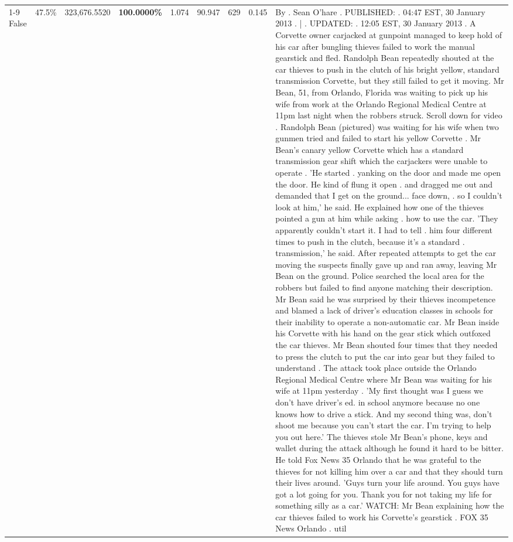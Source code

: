 \begin{table}[H]
\begin{tabular}{lllrlllll}
\cline{1-9} \cline{2-9}
False & 47.5\% & 323,676.5520 & \bfseries \color{red} 100.0000\% & 1.074 & 90.947 & 629 & 0.145 & By . Sean O'hare . PUBLISHED: . 04:47 EST, 30 January 2013 . | . UPDATED: . 12:05 EST, 30 January 2013 . A Corvette owner carjacked at gunpoint managed to keep hold of his car after bungling thieves failed to work the manual gearstick and fled. Randolph Bean repeatedly shouted at the car thieves to push in the clutch of his bright yellow, standard transmission Corvette, but they still failed to get it moving. Mr Bean, 51, from Orlando, Florida was waiting to pick up his wife from work at the Orlando Regional Medical Centre at 11pm last night when the robbers struck. Scroll down for video . Randolph Bean (pictured) was waiting for his wife when two gunmen tried and failed to start his yellow Corvette . Mr Bean's canary yellow Corvette which has a standard transmission gear shift which the carjackers were unable to operate . 'He started . yanking on the door and made me open the door. He kind of flung it open . and dragged me out and demanded that I get on the ground... face down, . so I couldn't look at him,' he said. He explained how one of the thieves pointed a gun at him while asking . how to use the car. 'They apparently couldn't start it. I had to tell . him four different times to push in the clutch, because it's a standard . transmission,' he said. After repeated attempts to get the car moving the suspects finally gave up and ran away, leaving Mr Bean on the ground. Police searched the local area for the robbers but failed to find anyone matching their description. Mr Bean said he was surprised by their thieves incompetence and blamed a lack of driver's education classes in schools for their inability to operate a non-automatic car. Mr Bean inside his Corvette with his hand on the gear stick which outfoxed the car thieves. Mr Bean shouted four times that they needed to press the clutch to put the car into gear but they failed to understand . The attack took place outside the Orlando Regional Medical Centre where Mr Bean was waiting for his wife at 11pm yesterday . 'My first thought was I guess we don't have driver's ed. in school anymore because no one knows how to drive a stick. And my second thing was, don't shoot me because you can't start the car. I'm trying to help you out here.' The thieves stole Mr Bean's phone, keys and wallet during the attack although he found it hard to be bitter. He told Fox News 35 Orlando that he was grateful to the thieves for not killing him over a car and that they should turn their lives around. 'Guys turn your life around. You guys have got a lot going for you. Thank you for not taking my life for something silly as a car.' WATCH: Mr Bean explaining how the car thieves failed to work his Corvette's gearstick . FOX 35 News Orlando . util \\

\end{tabular}
\end{table}
